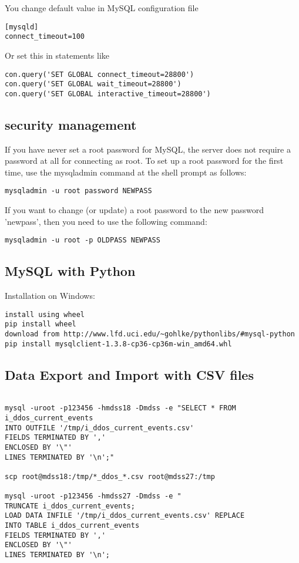 You change default value in MySQL configuration file

\begin{verbatim}
[mysqld]
connect_timeout=100
\end{verbatim}

Or set this in statements like
\begin{verbatim}
con.query('SET GLOBAL connect_timeout=28800')
con.query('SET GLOBAL wait_timeout=28800')
con.query('SET GLOBAL interactive_timeout=28800')
\end{verbatim}

\subsection{security management}

If you have never set a root password for MySQL, the server does not require a password at all for connecting as root. To set up a root password for the first time, use the mysqladmin command at the shell prompt as follows:

\begin{verbatim}
mysqladmin -u root password NEWPASS 
\end{verbatim}

If you want to change (or update) a root password to the new password 'newpass', then you need to use the following command:

\begin{verbatim}
mysqladmin -u root -p OLDPASS NEWPASS 
\end{verbatim}

\subsection{MySQL with Python}

Installation on Windows:
\begin{verbatim}
install using wheel
pip install wheel
download from http://www.lfd.uci.edu/~gohlke/pythonlibs/#mysql-python
pip install mysqlclient-1.3.8-cp36-cp36m-win_amd64.whl
\end{verbatim}


\subsection{Data Export and Import with CSV files}

\begin{verbatim}

mysql -uroot -p123456 -hmdss18 -Dmdss -e "SELECT * FROM i_ddos_current_events
INTO OUTFILE '/tmp/i_ddos_current_events.csv'
FIELDS TERMINATED BY ','
ENCLOSED BY '\"'
LINES TERMINATED BY '\n';"

scp root@mdss18:/tmp/*_ddos_*.csv root@mdss27:/tmp

mysql -uroot -p123456 -hmdss27 -Dmdss -e "
TRUNCATE i_ddos_current_events;
LOAD DATA INFILE '/tmp/i_ddos_current_events.csv' REPLACE
INTO TABLE i_ddos_current_events
FIELDS TERMINATED BY ','
ENCLOSED BY '\"'
LINES TERMINATED BY '\n';

\end{verbatim}


